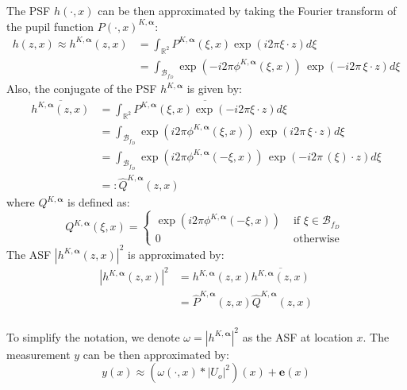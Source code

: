 \documentclass{article}
\begin{document}
The PSF $h(\cdot, x)$ can be then approximated by taking the Fourier transform of the pupil function $P(\cdot, x)^{K, \boldsymbol{\alpha}}$:
\begin{align}
    h(z, x) \approx h^{K, \boldsymbol{\alpha}}(z, x) &= \int_{\mathbb{R}^2} P^{K, \boldsymbol{\alpha}}(\xi, x) \exp \left(i 2\pi \xi \cdot z\right) d\xi \\
    & = \int_{\mathcal{B}_{f_D}} \exp (- i 2\pi \phi^{K, \boldsymbol{\alpha}}(\xi, x)) \, \exp \left(-i 2\pi \, \xi \cdot z\right) d\xi
\end{align}
Also, the conjugate of the PSF $h^{K, \boldsymbol{\alpha}}$ is given by:
\begin{align}
    \overline{h^{K, \boldsymbol{\alpha}}(z, x)} &= \int_{\mathbb{R}^2} \overline{P^{K, \boldsymbol{\alpha}}(\xi, x) \exp \left(-i 2\pi \xi \cdot z\right)} d\xi \\
    &= \int_{\mathcal{B}_{f_D}} \exp (i 2 \pi \phi^{K, \boldsymbol{\alpha}}(\xi, x)) \, \exp \left(i 2\pi \, \xi \cdot z\right) d\xi \\
    &= \int_{\mathcal{B}_{f_D}} \exp (i 2 \pi \phi^{K, \boldsymbol{\alpha}}(- \xi, x)) \, \exp \left(-i 2\pi \, (\xi) \cdot z\right) d\xi \\
    &=: \hat{Q}^{K, \boldsymbol{\alpha}}(z, x)
\end{align}
where $Q^{K, \boldsymbol{\alpha}}$ is defined as:
\begin{equation}
    Q^{K, \boldsymbol{\alpha}}(\xi,x) = \begin{cases}
        \exp (i 2 \pi \phi^{K, \boldsymbol{\alpha}}(-\xi, x)) & \mbox{ if } \xi \in \mathcal{B}_{f_D} \\
        0 & \mbox{ otherwise }
    \end{cases}
\end{equation}
The ASF $|h^{K, \boldsymbol{\alpha}}(z, x)|^2$ is approximated by:
\begin{align}
    |h^{K, \boldsymbol{\alpha}}(z, x)|^2 &= h^{K, \boldsymbol{\alpha}}(z, x) \overline{h^{K, \boldsymbol{\alpha}}(z, x)} \\
    &= \hat{P}^{K, \boldsymbol{\alpha}}(z, x) \hat{Q}^{K, \boldsymbol{\alpha}}(z, x) \\
\end{align}




To simplify the notation, we denote $\omega = |h^{K, \boldsymbol{\alpha}}|^2$ as the ASF at location $x$. The measurement $y$ can be then approximated by:
\begin{equation}
  y(x) \approx \left(\omega(\cdot, x) \ast |U_o|^2\right)(x) + \boldsymbol{e}(x)
\end{equation}
\end{document}
